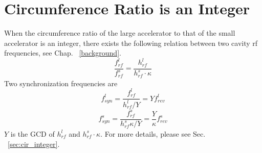 % 									
%
%
%
% 
%
\section{Circumference Ratio is an Integer}
\label{sec:integ}
When the circumference ratio of the large accelerator to that of the small accelerator is an integer, there exists the following relation between two cavity rf frequencies, see Chap. ~\ref{background}. 
\begin{equation}
\frac{f_{\mathit{rf}}^{l}}{f_{\mathit{rf}}^{s}}= \frac{h^l_\mathit{rf}}{h^s_\mathit{rf} \cdot \kappa}\label{cir_int_1}
\end{equation}
Two synchronization frequencies are
\begin{equation}
f_{\mathit{syn}}^{l}=\frac{f_{\mathit{rf}}^{l}}{h^l_\mathit{rf}/Y}=Y f_{\mathit{rev}}^{l} \label{synch_freq1_r}
\end{equation}
\begin{equation}
f_{\mathit{syn}}^{s}=\frac{f_{\mathit{rf}}^{s}}{h^s_\mathit{rf}\kappa/Y}=\frac{Y}{\kappa} f_{\mathit{rev}}^{s} \label{synch_freq2_r}
\end{equation}
$Y$ is the \gls{GCD} of $h^l_\mathit{rf}$ and $h^s_\mathit{rf} \cdot \kappa$. For more details, please see Sec. ~\ref{sec:cir_integer}.

